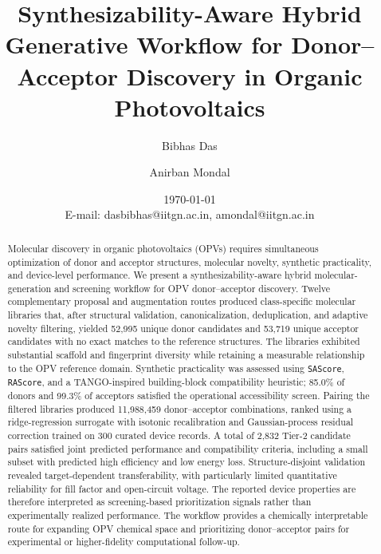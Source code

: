 \documentclass[12pt]{article}
\title{Synthesizability-Aware Hybrid Generative Workflow for Donor--Acceptor Discovery in Organic Photovoltaics}
\author[1,*]{Bibhas Das}
\author[1,*]{Anirban Mondal}
\affil[1]{\small Department of Chemistry, Indian Institute of Technology Gandhinagar, Gujarat, 382355, India}
\date{\small\today\\ {E-mail: dasbibhas@iitgn.ac.in, amondal@iitgn.ac.in}}
\makeatletter
\renewcommand{\maketitle}{
\begin{center}
{\LARGE \textbf{\@title}} \\[1em]   %
{\large \@author} \\[1em]           %
{\small \@date}                     %
\end{center}
}
\makeatother
\begin{document}
\maketitle

\begin{abstract}
Molecular discovery in organic photovoltaics (OPVs) requires simultaneous optimization of donor and acceptor structures, molecular novelty, synthetic practicality, and device-level performance. We present a synthesizability-aware hybrid molecular-generation and screening workflow for OPV donor--acceptor discovery. Twelve complementary proposal and augmentation routes produced class-specific molecular libraries that, after structural validation, canonicalization, deduplication, and adaptive novelty filtering, yielded 52{,}995 unique donor candidates and 53{,}719 unique acceptor candidates with no exact matches to the reference structures. The libraries exhibited substantial scaffold and fingerprint diversity while retaining a measurable relationship to the OPV reference domain. Synthetic practicality was assessed using \texttt{SAScore}, \texttt{RAScore}, and a TANGO-inspired building-block compatibility heuristic; 85.0\% of donors and 99.3\% of acceptors satisfied the operational accessibility screen. Pairing the filtered libraries produced 11{,}988{,}459 donor--acceptor combinations, ranked using a ridge-regression surrogate with isotonic recalibration and Gaussian-process residual correction trained on 300 curated device records. A total of 2{,}832 Tier-2 candidate pairs satisfied joint predicted performance and compatibility criteria, including a small subset with predicted high efficiency and low energy loss. Structure-disjoint validation revealed target-dependent transferability, with particularly limited quantitative reliability for fill factor and open-circuit voltage. The reported device properties are therefore interpreted as screening-based prioritization signals rather than experimentally realized performance. The workflow provides a chemically interpretable route for expanding OPV chemical space and prioritizing donor--acceptor pairs for experimental or higher-fidelity computational follow-up.
\end{abstract}
\end{document}
